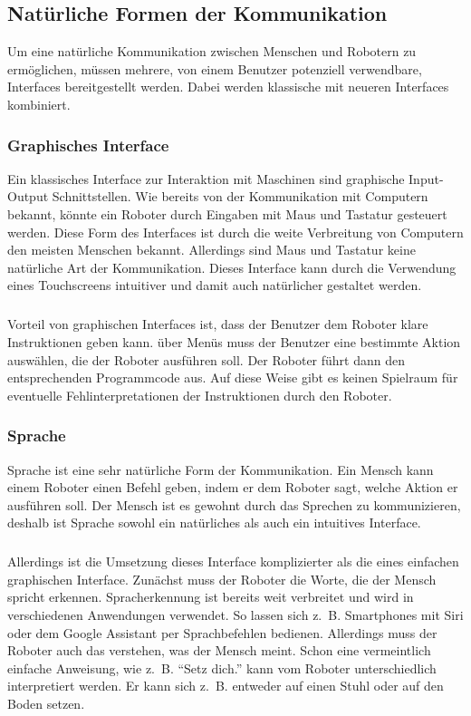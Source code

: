 \subsection{Natürliche Formen der
Kommunikation}\label{sec:nat-formen-kommunikation}
Um eine natürliche Kommunikation zwischen Menschen und Robotern zu ermöglichen,
müssen mehrere, von einem Benutzer potenziell verwendbare, Interfaces
bereitgestellt werden. Dabei werden klassische mit neueren Interfaces
kombiniert.

\subsubsection{Graphisches Interface}
Ein klassisches Interface zur Interaktion mit Maschinen sind graphische
Input-Output Schnittstellen. Wie bereits von der Kommunikation mit Computern
bekannt, könnte ein Roboter durch Eingaben mit Maus und Tastatur gesteuert
werden. Diese Form des Interfaces ist durch die weite Verbreitung von Computern
den meisten Menschen bekannt. Allerdings sind Maus und Tastatur keine
natürliche Art der Kommunikation. Dieses Interface kann durch die Verwendung
eines Touchscreens intuitiver und damit auch natürlicher gestaltet werden.

\subparagraph{}
Vorteil von graphischen Interfaces ist, dass der Benutzer dem Roboter klare
Instruktionen geben kann. über Menüs muss der Benutzer eine bestimmte Aktion
auswählen, die der Roboter ausführen soll. Der Roboter führt dann den
entsprechenden Programmcode aus. Auf diese Weise gibt es keinen Spielraum für
eventuelle Fehlinterpretationen der Instruktionen durch den Roboter.

\subsubsection{Sprache}
Sprache ist eine sehr natürliche Form der Kommunikation. Ein Mensch kann einem
Roboter einen Befehl geben, indem er dem Roboter sagt, welche Aktion er
ausführen soll. Der Mensch ist es gewohnt durch das Sprechen zu kommunizieren,
deshalb ist Sprache sowohl ein natürliches als auch ein intuitives Interface.

\subparagraph{}
Allerdings ist die Umsetzung dieses Interface komplizierter als die eines
einfachen graphischen Interface. Zunächst muss der Roboter die Worte, die der
Mensch spricht erkennen. Spracherkennung ist bereits weit verbreitet und wird in
verschiedenen Anwendungen verwendet. So lassen sich z.~B. Smartphones mit Siri
oder dem Google Assistant per Sprachbefehlen bedienen. Allerdings muss der
Roboter auch das verstehen, was der Mensch meint. Schon eine vermeintlich
einfache Anweisung, wie z.~B. "`Setz dich."' kann vom Roboter unterschiedlich
interpretiert werden. Er kann sich z.~B. entweder auf einen Stuhl oder auf den
Boden setzen.

